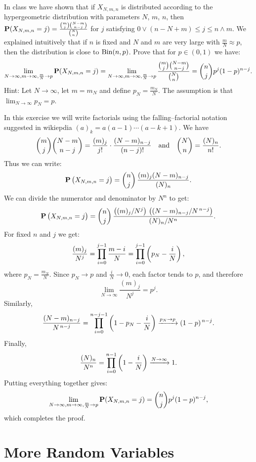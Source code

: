 \documentclass[11pt,a4paper]{article}
\begin{document}
\begin{exercise}
  In class we have shown that if $X_{N,m,n}$ is distributed according to the
  hypergeometric distribution with parameters $N$, $m$, $n$,
  then $\mathbf{P}(X_{N,m,n} = j) = \frac{\binom{m}{j} \binom{N-m}{n-j}}{\binom{N}{n}}$
  for $j$ satisfying $0 \vee (n - N + m) \le j \le n \wedge m$.
  We explained intuitively that if $n$ is fixed and $N$ and $m$ are very large
  with $\frac{m}{N} \approx p$, then the distribution is close to $\operatorname{Bin}(n,p)$.
  Prove that for $p \in (0,1)$ we have:
  \[
    \lim_{N \to \infty,m \to \infty, \frac{m}{N} \to p} \mathbf{P}(X_{N,m,n} = j) =
    \lim_{N \to \infty,m \to \infty, \frac{m}{N} \to p} \frac{\binom{m}{j} \binom{N-m}{n-j}}{\binom{N}{n}} =
    \binom{n}{j} p^j (1 - p)^{n - j}.
  \]
  Hint: Let $N \to \infty$, let $m = m_N$ and define $p_N = \frac{m_N}{N}$.
  The assumption is that $\lim_{N \to \infty} p_N = p$.
\end{exercise}
\begin{solution}
  In this exercise we will write factorials using the falling–factorial notation
  suggested in wikiepdia $(a)_k = a(a-1)\cdots(a-k+1)$.
  We have
  \[
    \binom{m}{j}\binom{N-m}{n-j}
    = \frac{(m)_j}{j!}\cdot\frac{(N-m)_{n-j}}{(n-j)!}
    \quad \text{and} \quad
    \binom{N}{n} = \frac{(N)_n}{n!}.
  \]
  Thus we can write:
  \[
    \Prob\del{X_{N,m,n}=j}
    = \binom{n}{j}\,
      \frac{(m)_j (N-m)_{n-j}}{(N)_n}.
  \]
  We can divide the numerator and denominator by $N^n$ to get:
  \[
    \Prob\del{X_{N,m,n}=j}
    = \binom{n}{j}\,
      \frac{
        \del{(m)_j / N^j}\,\del{(N-m)_{n-j}/N^{\,n-j}}
      }{
        (N)_n / N^n
      }.
  \]
  For fixed $n$ and $j$ we get:
  \[
    \frac{(m)_j}{N^j}
    = \prod_{i=0}^{j-1} \frac{m-i}{N}
    = \prod_{i=0}^{j-1} \del{ p_N - \frac{i}{N} },
  \]
  where $p_N = \frac{m_N}{N}$.
  Since $p_N \to p$ and $\frac{i}{N} \to 0$,
  each factor tends to $p$, and therefore
  \[
    \lim_{N\to\infty} \frac{(m)_j}{N^j} = p^j.
  \]
  Similarly,
  \[
    \frac{(N-m)_{n-j}}{N^{\,n-j}}
    = \prod_{i=0}^{n-j-1} \del{ 1 - p_N - \frac{i}{N} }
    \taking{p_N \to p} (1-p)^{\,n-j}.
  \]
  Finally,
  \[
    \frac{(N)_n}{N^n}
    = \prod_{i=0}^{n-1} \del{ 1 - \frac{i}{N} }
    \taking{N \to \infty} 1.
  \]
  Putting everything together gives:
  \[
    \lim_{N \to \infty,m \to \infty, \frac{m}{N} \to p} \mathbf{P}(X_{N,m,n} = j) =
    \binom{n}{j} p^j (1 - p)^{n - j},
  \]
  which completes the proof.
\end{solution}

\newpage

\section{More Random Variables}
\end{document}
